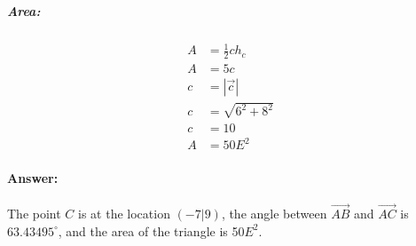 \subparagraph{Area:}
\begin{align}
    A &= \frac{1}{2}ch_c \\
    A &= 5c \\[20pt]
    c &= |\vec{c}| \\
    c &= \sqrt{6^2 + 8^2} \\
    c &= 10 \\[20pt]
    A &= 50E^2
\end{align}

\paragraph{Answer:}
The point $C$ is at the location $(-7|9)$, the angle between $\vec{AB}$ and $\vec{AC}$ is 
$63.43495^\circ$, and the area of the triangle is 50$E^2$. 
